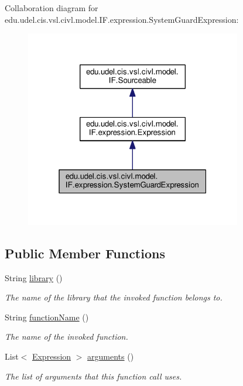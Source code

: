 Collaboration diagram for edu.\+udel.\+cis.\+vsl.\+civl.\+model.\+I\+F.\+expression.\+System\+Guard\+Expression\+:
\nopagebreak
\begin{figure}[H]
\begin{center}
\leavevmode
\includegraphics[width=268pt]{interfaceedu_1_1udel_1_1cis_1_1vsl_1_1civl_1_1model_1_1IF_1_1expression_1_1SystemGuardExpression__coll__graph}
\end{center}
\end{figure}
\subsection*{Public Member Functions}
\begin{DoxyCompactItemize}
\item 
String \hyperlink{interfaceedu_1_1udel_1_1cis_1_1vsl_1_1civl_1_1model_1_1IF_1_1expression_1_1SystemGuardExpression_aa6e5902944a26f682b2cae7ab9ed7952}{library} ()
\begin{DoxyCompactList}\small\item\em The name of the library that the invoked function belongs to. \end{DoxyCompactList}\item 
String \hyperlink{interfaceedu_1_1udel_1_1cis_1_1vsl_1_1civl_1_1model_1_1IF_1_1expression_1_1SystemGuardExpression_a373ecd0aa4479fb1ec2490eaf4f1d183}{function\+Name} ()
\begin{DoxyCompactList}\small\item\em The name of the invoked function. \end{DoxyCompactList}\item 
List$<$ \hyperlink{interfaceedu_1_1udel_1_1cis_1_1vsl_1_1civl_1_1model_1_1IF_1_1expression_1_1Expression}{Expression} $>$ \hyperlink{interfaceedu_1_1udel_1_1cis_1_1vsl_1_1civl_1_1model_1_1IF_1_1expression_1_1SystemGuardExpression_ade890e79bc66e63c8332cb1d1f9829a5}{arguments} ()
\begin{DoxyCompactList}\small\item\em The list of arguments that this function call uses. \end{DoxyCompactList}\end{DoxyCompactItemize}


